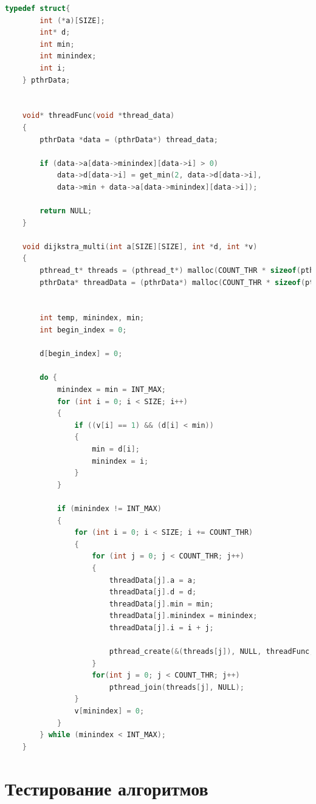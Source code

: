 \documentclass[a4paper,14pt, unknownkeysallowed]{extreport}
\begin{document}
\begin{lstlisting}[label=dijkstra_thread,caption=Алгоритм Дейкстры с использованием параллельных вычислений,language=C]
    typedef struct{
        int (*a)[SIZE];
        int* d;
        int min;
        int minindex;
        int i;
    } pthrData;


    void* threadFunc(void *thread_data)
    {
        pthrData *data = (pthrData*) thread_data;
	
        if (data->a[data->minindex][data->i] > 0)
            data->d[data->i] = get_min(2, data->d[data->i], 
            data->min + data->a[data->minindex][data->i]);
	
        return NULL;
    }

    void dijkstra_multi(int a[SIZE][SIZE], int *d, int *v)
    {
        pthread_t* threads = (pthread_t*) malloc(COUNT_THR * sizeof(pthread_t));
        pthrData* threadData = (pthrData*) malloc(COUNT_THR * sizeof(pthrData));

	
        int temp, minindex, min;
        int begin_index = 0;
    
        d[begin_index] = 0;
  
        do {
            minindex = min = INT_MAX;
            for (int i = 0; i < SIZE; i++)
            {
                if ((v[i] == 1) && (d[i] < min))
                {
                    min = d[i];
                    minindex = i;
                }
            }

            if (minindex != INT_MAX)
            {	
                for (int i = 0; i < SIZE; i += COUNT_THR)
                {		
                    for (int j = 0; j < COUNT_THR; j++)
                    {
                        threadData[j].a = a;
                        threadData[j].d = d;
                        threadData[j].min = min;
                        threadData[j].minindex = minindex;
                        threadData[j].i = i + j;
					
                        pthread_create(&(threads[j]), NULL, threadFunc, &threadData[j]);
                    }
                    for(int j = 0; j < COUNT_THR; j++)
                        pthread_join(threads[j], NULL);
                }
                v[minindex] = 0;
            }
        } while (minindex < INT_MAX);
    }
\end{lstlisting}

\section{Тестирование алгоритмов}
\end{document}
